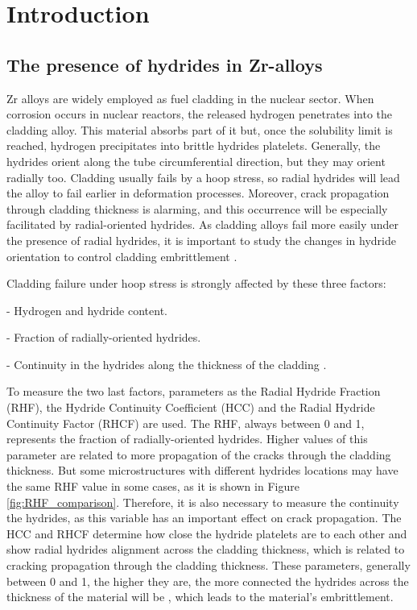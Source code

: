 \section{Introduction}

\subsection{The presence of hydrides in Zr-alloys}

\justify
\noindent
Zr alloys are widely employed as fuel cladding in the nuclear sector. When corrosion occurs in nuclear reactors, the released hydrogen penetrates into the cladding alloy. This material absorbs part of it but, once the solubility limit is reached, hydrogen precipitates into brittle hydrides platelets. Generally, the hydrides orient along the tube circumferential direction, but they may orient radially too. Cladding usually fails by a hoop stress, so radial hydrides will lead the alloy to fail earlier in deformation processes. Moreover, crack propagation through cladding thickness is alarming, and this occurrence will be especially facilitated by radial-oriented hydrides. As cladding alloys fail more easily under the presence of radial hydrides, it is important to study the changes in hydride orientation to control cladding embrittlement \cite{SIMON2021152817, COLAS2013586, SHARMA2018546, SUNIL2020152457}.

\noindent
Cladding failure under hoop stress is strongly  affected by these three factors:

\vspace{0.1 mm}
- Hydrogen and hydride content.

\vspace{0.1 mm}
- Fraction of radially-oriented hydrides.

\vspace{0.1 mm}
- Continuity in the hydrides along the thickness of the cladding \cite{SIMON2021152817}.

\noindent
To measure the two last factors, parameters as the Radial Hydride Fraction (RHF), the Hydride Continuity Coefficient (HCC) and the Radial Hydride Continuity Factor (RHCF) are used. The RHF, always between 0 and 1, represents the fraction of radially-oriented hydrides. Higher values of this parameter are related to more propagation of the cracks through the cladding thickness. But some microstructures with different hydrides locations may have the same RHF value in some cases, as it is shown in Figure \ref{fig:RHF_comparison}. Therefore, it is also necessary to measure the continuity the hydrides, as this variable has an important effect on crack propagation. The HCC and RHCF determine how close the hydride platelets are to each other and show radial hydrides alignment across the cladding thickness, which is related to cracking propagation through the cladding thickness. These parameters, generally between 0 and 1, the higher they are, the more connected the hydrides across the thickness of the material will be \cite{SIMON2021152817}, which leads to the material's embrittlement.

